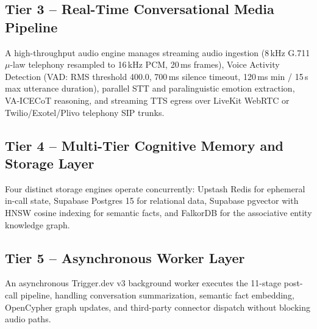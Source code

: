 \documentclass[12pt,a4paper]{article}
\begin{document}
\subsection{Tier 3 -- Real-Time Conversational Media Pipeline}
A high-throughput audio engine manages streaming audio ingestion (8\,kHz G.711 $\mu$-law telephony resampled to 16\,kHz PCM, 20\,ms frames), Voice Activity Detection (VAD: RMS threshold 400.0, 700\,ms silence timeout, 120\,ms min / 15\,s max utterance duration), parallel STT and paralinguistic emotion extraction, VA-ICECoT reasoning, and streaming TTS egress over LiveKit WebRTC or Twilio/Exotel/Plivo telephony SIP trunks.

\subsection{Tier 4 -- Multi-Tier Cognitive Memory and Storage Layer}
Four distinct storage engines operate concurrently: Upstash Redis for ephemeral in-call state, Supabase Postgres 15 for relational data, Supabase pgvector with HNSW cosine indexing for semantic facts, and FalkorDB for the associative entity knowledge graph.

\subsection{Tier 5 -- Asynchronous Worker Layer}
An asynchronous Trigger.dev v3 background worker executes the 11-stage post-call pipeline, handling conversation summarization, semantic fact embedding, OpenCypher graph updates, and third-party connector dispatch without blocking audio paths.

\end{document}
